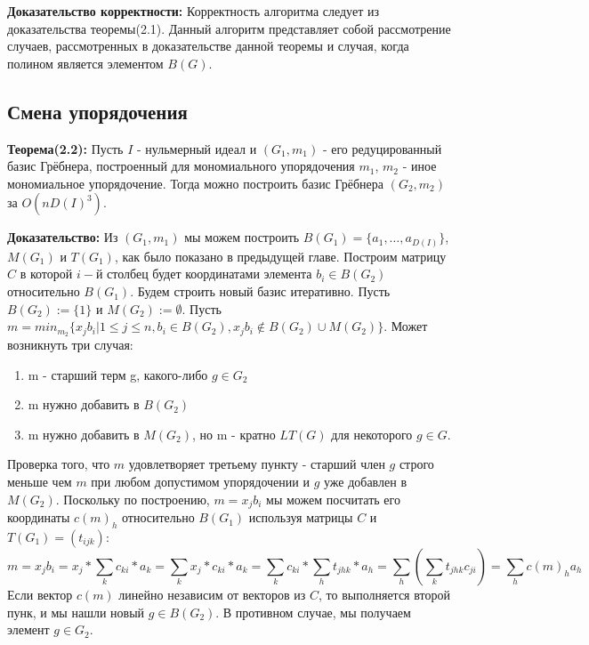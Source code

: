 \documentclass{article}
\begin{document}
    \newpage    
    \textbf{Доказательство корректности:}
        Корректность алгоритма следует из доказательства теоремы(2.1). 
        Данный алгоритм представляет собой рассмотрение случаев, рассмотренных в доказательстве данной теоремы и случая, когда полином
        является элементом $B(G)$.

    \newpage
    \subsection{Смена упорядочения}
    \textbf{Теорема(2.2):} Пусть $I$ - нульмерный идеал и $(G_1, m_1)$ - его редуцированный 
    базис Грёбнера, построенный для мономиального упорядочения $m_1$, $m_2$ - иное мономиальное упорядочение. Тогда можно построить
    базис Грёбнера $(G_2, m_2)$ за $O(nD(I)^3)$.
    
    \textbf{Доказательство:} Из $(G_1, m_1)$ мы можем построить $B(G_1) = \{a_1,\ldots,a_{D(I)}\}$, $M(G_1)$ и $T(G_1)$, как
    было показано в предыдущей главе. Построим матрицу $C$ в которой $i-$й столбец будет координатами элемента $b_i \in B(G_2)$
    относительно $B(G_1)$.
    Будем строить новый базис итеративно.
    Пусть $B(G_2) := \{1\}$ и $M(G_2) := \emptyset$. Пусть $m = min_{m_2} \{x_jb_i | 1\leq j \leq n, b_i \in B(G_2), 
    x_jb_i\notin B(G_2)\cup M(G_2)\}$. Может возникнуть три случая:
    \begin{enumerate}
        \item m - старший терм g, какого-либо $g \in G_2$
        \item m нужно добавить в $B(G_2)$
        \item m нужно добавить в $M(G_2)$, но m - кратно $LT(G)$ для некоторого $g \in G$.
    \end{enumerate}
    Проверка того, что $m$ удовлетворяет третьему пункту - старший член $g$ строго меньше чем $m$ при любом допустимом упорядочении
    и $g$ уже добавлен в $M(G_2)$.
    Поскольку по построению, $m=x_jb_i$ мы можем посчитать его координаты $c(m)_h$ относительно $B(G_1)$ используя матрицы $C$ и $T(G_1) = (t_{ijk})$:
    $$m=x_jb_i=x_j*\sum_k c_{ki}*a_k = \sum_k x_j*c_{ki}*a_k = \sum_k c_{ki}*\sum_h t_{jhk}*a_h = \sum_h (\sum_k t_{jhk}c_{ji}) = \sum_h c(m)_ha_h$$
    Если вектор $c(m)$ линейно независим от векторов из $C$, то выполняется второй пунк, и мы нашли новый $g \in B(G_2)$. В противном случае,
    мы получаем элемент $g \in G_2$.
    \newpage
\end{document}
